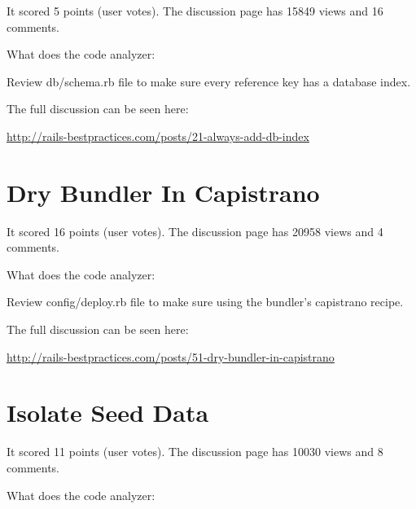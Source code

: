 It scored 5 points (user votes). 
The discussion page has 15849 views and 16 comments.

What does the code analyzer:

Review db/schema.rb file to make sure every reference key has a database index.

The full discussion can be seen here:

\url{http://rails-bestpractices.com/posts/21-always-add-db-index}

\section{Dry Bundler In Capistrano}


It scored 16 points (user votes). 
The discussion page has 20958 views and 4 comments.

What does the code analyzer:

Review config/deploy.rb file to make sure using the bundler's capistrano recipe.

The full discussion can be seen here:
 
\url{http://rails-bestpractices.com/posts/51-dry-bundler-in-capistrano}

\section{Isolate Seed Data}


It scored 11 points (user votes). 
The discussion page has 10030 views and 8 comments.

What does the code analyzer:

